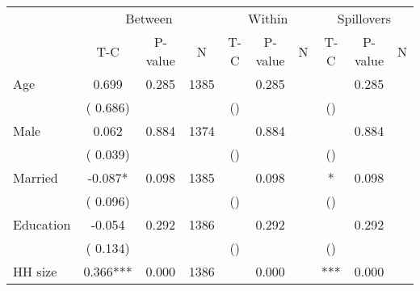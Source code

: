 
\begin{tabular}{l*{9}{c}}\hline&\multicolumn{3}{c}{Between}&\multicolumn{3}{c}{Within}&\multicolumn{3}{c}{Spillovers} \\ \cmidrule(r){2-4}\cmidrule(l){5-7}\cmidrule(l){8-10} & {T-C} & {P-value} & {N} & {T-C} & {P-value} & {N}  & {T-C} & {P-value} & {N}  \\ \midrule
 Age                 &              0.699          &        0.285 & 1385          &                 &        0.285 &           &  &        0.285 &                                  \\ 
                               &        (       0.686) & &                                                                 &       () & &                                                          &       ()      & &                             \\ 
 Male                 &              0.062          &        0.884 & 1374          &        &        0.884 &                    &  &        0.884 &                                  \\ 
                               &        (       0.039) & &                                                                 &       () & &                                                          &       () & &                                          \\ 
 Married                 &             -0.087*          &        0.098 & 1385          &        &        0.098 &                    & * &        0.098 &                                  \\ 
                               &        (       0.096) & &                                                                 &       () & &                                                          &       () & &                                          \\ 
 Education                 &             -0.054          &        0.292 & 1386          &        &        0.292 &                    &  &        0.292 &                                  \\ 
                               &        (       0.134) & &                                                                 &       () & &                                                          &       () & &                                          \\ 
 HH size                 &              0.366***          &        0.000 & 1386          &        &        0.000 &                    & *** &        0.000 &                                  \\ 

\end{tabular}
